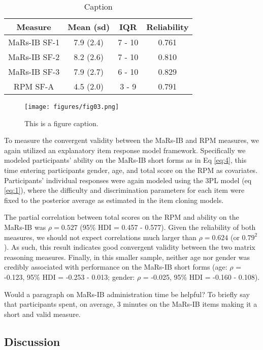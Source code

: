 \documentclass[a4paper,man,natbib]{apa6}
\begin{document}
\begin{table}
    \centering
    \begin{tabular}{c|c|c|c}
    Measure & Mean (sd) & IQR & Reliability \\
    \hline
    MaRs-IB SF-1 & 7.9 (2.4) & 7 - 10 & 0.761 \\
    MaRs-IB SF-2 & 8.2 (2.6) & 7 - 10 & 0.810 \\
    MaRs-IB SF-3 & 7.9 (2.7) & 6 - 10 & 0.829 \\
    RPM SF-A & 4.5 (2.0) & 3 - 9 & 0.791 \\
    \end{tabular}
    \caption{Caption}
    \label{table:2}
\end{table}

\begin{figure}
\centering
\texttt{[image: figures/fig03.png]}
\caption{\label{fig:fig03}This is a figure caption.}
\end{figure}

To measure the convergent validity between the MaRs-IB and RPM measures, we again utilized an explanatory item response model framework. Specifically we modeled participants' ability on the MaRs-IB short forms as in Eq \ref{eq:4}, this time entering participants gender, age, and total score on the RPM as covariates. Participants' individual responses were again modeled using the 3PL model (eq \ref{eq:1}), where the difficulty and discrimination parameters for each item were fixed to the posterior average as estimated in the item cloning models.

The partial correlation between total scores on the RPM and ability on the MaRs-IB was $\rho = 0.527$ (95\% HDI = 0.457 - 0.577). Given the reliability of both measures, we should not expect correlations much larger than $\rho = 0.624$ (or $0.79^2$). As such, this result indicates good convergent validity between the two matrix reasoning measures. Finally, in this smaller sample, neither age nor gender was credibly associated with performance on the MaRs-IB short forms (age: $\rho$ = -0.123, 95\% HDI = -0.253 - 0.013; gender: $\rho$ = -0.025, 95\% HDI = -0.160 - 0.108). 

Would a paragraph on MaRs-IB administration time be helpful? To briefly say that participants spent, on average, 3 minutes on the MaRs-IB items making it a short and valid measure.

\subsection{Discussion}
\end{document}
